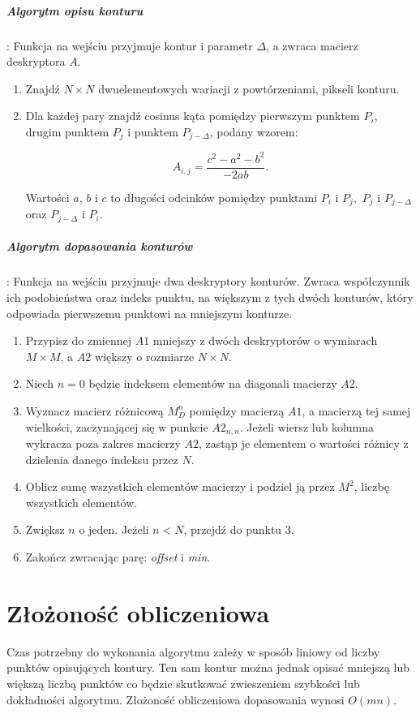 \subparagraph{Algorytm opisu konturu}: Funkcja na wejściu przyjmuje kontur i
parametr $\Delta$, a zwraca macierz deskryptora $A$.  

\begin{enumerate} \item Znajdź $N \times N$ dwuelementowych wariacji z
    powtórzeniami, pikseli konturu. \item Dla każdej pary znajdź cosinus kąta
    pomiędzy pierwszym punktem $P_{i}$, drugim punktem $P_{j}$ i punktem
    $P_{j-\Delta}$, podany wzorem: 

\begin{equation}
  A_{i,j} = \frac{c^2 - a^2 - b^2}{-2ab}.
\end{equation}

 Wartości $a$, $b$ i $c$ to długości odcinków pomiędzy punktami $P_i$ i $P_j,$
 $P_j$ i $P_{j-\Delta}$ oraz $P_{j-\Delta}$ i $P_i$. \end{enumerate}

\subparagraph{Algorytm dopasowania konturów}: Funkcja na wejściu przyjmuje dwa
deskryptory konturów. Zwraca współczynnik ich podobieństwa oraz indeks punktu,
na większym z tych dwóch konturów, który odpowiada pierwszemu punktowi na
mniejszym konturze.

\begin{enumerate} \item Przypisz do zmiennej $A1$ mniejszy z dwóch deskryptorów
    o wymiarach $M \times M$, a $A2$ większy o rozmiarze $N \times N$. \item
    Niech $n = 0$ będzie indeksem elementów na diagonali macierzy $A2$. \item
    Wyznacz macierz różnicową $M_{D}^n$ pomiędzy macierzą $A1$, a macierzą tej
    samej wielkości, zaczynającej się w punkcie $A2_{n,n}$. Jeżeli wiersz lub
    kolumna wykracza poza zakres macierzy $A2$, zastąp je elementem o wartości
    różnicy z dzielenia danego indeksu przez $N$. \item Oblicz sumę wszystkich
    elementów macierzy i podziel ją przez $M^2$, liczbę wszystkich elementów.
  \item Zwiększ $n$ o jeden. Jeżeli $n < N$, przejdź do punktu 3. \item Zakończ
    zwracając parę: \textit{offset} i \textit{min}.  \end{enumerate}

\section{Złożoność obliczeniowa}

Czas potrzebny do wykonania algorytmu zależy w sposób liniowy od liczby punktów
opisujących kontury. Ten sam kontur można jednak opisać mniejszą lub większą
liczbą punktów co będzie skutkować zwieszeniem szybkości lub dokładności
algorytmu. Złożoność obliczeniowa dopasowania wynosi $O(mn)$.
